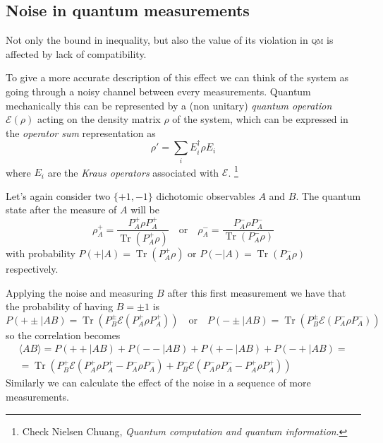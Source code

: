 \documentclass[a4paper]{article}
\DeclareMathOperator{\Tr}{Tr}
\newcommand{\acron}[1]{\textsc{#1}}
\newcommand{\QM}{\acron{qm}}
\newcommand{\qE}{\mathcal{E}}
\newcommand{\adj}{\dagger}
\theoremstyle{definition}
\begin{document}
\subsection{Noise in quantum measurements}
Not only the bound in inequality, but also the value of its
violation in \QM{} is affected by lack of compatibility.

To give a more accurate description of this effect we can think of the system as
going through a noisy channel between every measurements.
Quantum mechanically this can be represented by a (non unitary) \emph{quantum
operation} $\qE(\rho)$ acting on the density matrix $\rho$ of the system, which
can be expressed in the \emph{operator sum} representation as
\begin{equation}
    \rho' = \sum_i E_i^\adj \rho E_i
    \label{eq:kraus_evolution}
\end{equation}
where $E_i$ are the \emph{Kraus operators} associated with $\qE$.
\footnote{Check Nielsen Chuang, \emph{Quantum computation and quantum
information}.}

Let's again consider two $\{+1,-1\}$ dichotomic observables $A$ and $B$.
The quantum state after the measure of $A$ will be
\begin{equation}
    \rho_A^+ = \frac{P_A^+\rho P_A^+}{\Tr\left( P_A^+\rho \right)} 
    \quad \text{or} \quad
    \rho_A^- = \frac{P_A^-\rho P_A^-}{\Tr\left( P_A^-\rho \right)}
    \label{eq:projective_measure_A}
\end{equation}
with probability $P(+|A) = \Tr\left( P_A^+ \rho \right)$ or $P(-|A) = \Tr\left(
P_A^- \rho \right)$ respectively.

Applying the noise and measuring $B$ after this first measurement we have that
the probability of having $B=\pm 1$ is
\begin{equation}
    P(+\pm|AB) = \Tr\left( P_B^\pm \qE\left(P_A^+\rho P_A^+\right) \right)
    \quad \text{or} \quad
    P(-\pm|AB) = \Tr\left( P_B^\pm \qE\left(P_A^-\rho P_A^-\right) \right)
\end{equation}
so the correlation becomes
\begin{multline}
    \langle{AB}\rangle = P(++|AB) + P(--|AB) + P(+-|AB) + P(-+|AB) =\\
    = \Tr\left( P_B^+ \qE\left(P_A^+\rho P_A^+ - P_A^-\rho P_A^-\right) +
        P_B^- \qE\left(P_A^-\rho P_A^- - P_A^+\rho P_A^+\right)
    \right)
\end{multline}
Similarly we can calculate the effect of the noise in a sequence of more
measurements. 
\end{document}
